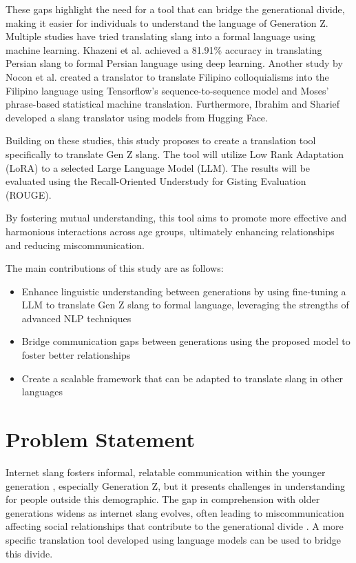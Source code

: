 These gaps highlight the need for a tool that can bridge the generational divide, making it easier for individuals to understand the language of Generation Z. Multiple studies have tried translating slang into a formal language using machine learning. Khazeni et al. achieved a 81.91\% accuracy in translating Persian slang to formal Persian language using deep learning. Another study by Nocon et al. created a translator to translate Filipino colloquialisms into the Filipino language using Tensorflow’s sequence-to-sequence model and Moses’ phrase-based statistical machine translation. Furthermore, Ibrahim and Sharief developed a slang translator using models from Hugging Face. 

Building on these studies, this study proposes to create a translation tool specifically to translate Gen Z slang. The tool will utilize Low Rank Adaptation (LoRA) to a selected Large Language Model (LLM). The results will be evaluated using the Recall-Oriented Understudy for Gisting Evaluation (ROUGE). 

By fostering mutual understanding, this tool aims to promote more effective and harmonious interactions across age groups, ultimately enhancing relationships and reducing miscommunication.

The main contributions of this study are as follows:
\begin{itemize}
	\item Enhance linguistic understanding between generations by using fine-tuning a LLM to translate Gen Z slang to formal language, leveraging the strengths of advanced NLP techniques
	\item Bridge communication gaps between generations using the proposed model to foster better relationships
	\item Create a scalable framework that can be adapted to translate slang in other languages
\end{itemize}

\section{Problem Statement}
\label{sec:problem_statement}

Internet slang fosters informal, relatable communication within the younger generation \cite{Ghazali_Abdullah_2021}, especially Generation Z, but it presents challenges in understanding for people outside this demographic. 
The gap in comprehension with older generations widens as internet slang evolves, often leading to miscommunication affecting social relationships that contribute to the generational divide \cite{Vacalares_Salas_Babac_Cagalawan_Calimpong_2023}. 
A more specific translation tool developed using language models can be used to bridge this divide.


